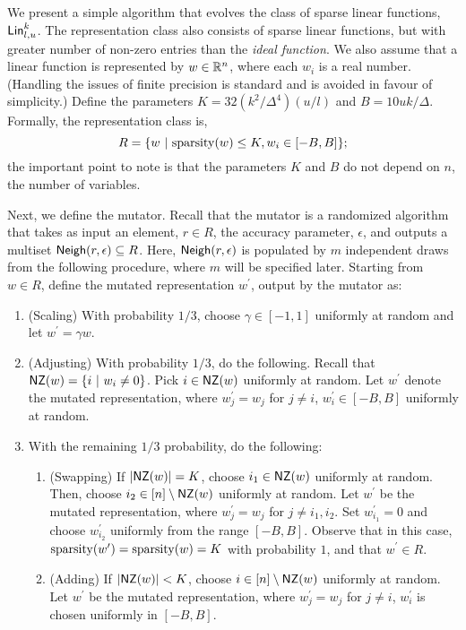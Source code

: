 We present a simple algorithm that evolves the class of sparse linear functions,
$\mathsf{Lin}^k_{l, u}$.  The representation class also consists of sparse linear
functions, but with greater number of non-zero entries than the \emph{ideal
function}. We also assume that a linear function is represented by $w \in
\mathbb{R}^n$, where each $w_i$ is a real number. (Handling the issues of finite
precision is standard and is avoided in favour of simplicity.) Define the
parameters $K = 32(k^2/\Delta^4)(u/l)$ and $B = 10 uk /\Delta$. Formally, the
representation class is,
\[ 
R = \{ w ~|~ \mathrm{sparsity}(w) \leq K, w_i \in [-B, B] \};
\]
the important point to note is that the parameters $K$ and $B$ do not depend on
$n$, the number of variables.

Next, we define the mutator. Recall that the mutator is a randomized algorithm
that takes as input an element, $r \in R$, the accuracy parameter, $\epsilon$,
and outputs a multiset $\mathsf{Neigh}(r, \epsilon) \subseteq R$. Here, $\mathsf{Neigh}(r,
\epsilon)$ is populated by $m$ independent draws from the following procedure,
where $m$ will be specified later. Starting from $w \in R$, define the mutated
representation $w^\prime$, output by the mutator as:
\begin{enumerate}
%
\item (Scaling) With probability $1/3$, choose $\gamma \in [-1, 1]$ uniformly at
random and let $w^\prime = \gamma w$. 
%
\item (Adjusting) With probability $1/3$, do the following. Recall that $\mathsf{NZ}(w)
= \{ i~|~ w_i \neq 0 \}$. Pick $i \in \mathsf{NZ}(w)$ uniformly at random. Let
$w^\prime$ denote the mutated representation, where $w^\prime_j = w_j$ for $j
\neq i$, $w^\prime_i \in [-B, B]$ uniformly at random. 
%
\item With the remaining $1/3$ probability, do the following:
\begin{enumerate}
\item (Swapping) If $|\mathsf{NZ}(w)| = K$, choose $i_1 \in \mathsf{NZ}(w)$ uniformly at random.
Then, choose $i_2 \in [n] \setminus \mathsf{NZ}(w)$ uniformly at random. Let $w^\prime$
be the mutated representation, where $w_j^\prime = w_j$ for $j \neq i_1, i_2$.
Set $w_{i_1}^\prime = 0$ and choose $w_{i_2}^\prime$ uniformly from the range
$[-B, B]$. Observe that in this case, $\mathrm{sparsity}(w^\prime) = \mathrm{sparsity}(w) = K$
with probability $1$, and that $w^\prime \in R$.
\item (Adding) If $|\mathsf{NZ}(w)| < K$, choose $i \in [n] \setminus \mathsf{NZ}(w)$ uniformly
at random. Let $w^\prime$ be the mutated representation, where $w_j^\prime =
w_j$ for $j \neq i$, $w^\prime_i$ is chosen uniformly in $[-B, B]$. 
\end{enumerate}
\end{enumerate}

